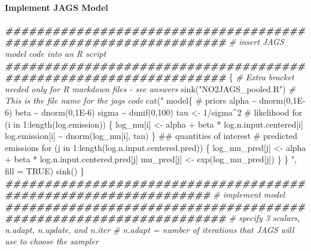 \documentclass[
]{article}
\newenvironment{Shaded}{\begin{snugshade}}{\end{snugshade}}
\newcommand{\AttributeTok}[1]{\textcolor[rgb]{0.77,0.63,0.00}{#1}}
\newcommand{\CommentTok}[1]{\textcolor[rgb]{0.56,0.35,0.01}{\textit{#1}}}
\newcommand{\ConstantTok}[1]{\textcolor[rgb]{0.00,0.00,0.00}{#1}}
\newcommand{\DocumentationTok}[1]{\textcolor[rgb]{0.56,0.35,0.01}{\textbf{\textit{#1}}}}
\newcommand{\FunctionTok}[1]{\textcolor[rgb]{0.00,0.00,0.00}{#1}}
\newcommand{\NormalTok}[1]{#1}
\newcommand{\StringTok}[1]{\textcolor[rgb]{0.31,0.60,0.02}{#1}}
\begin{document}
\hypertarget{implement-jags-model}{%
\paragraph{Implement JAGS Model}\label{implement-jags-model}}

\begin{Shaded}
\begin{Highlighting}[]
\DocumentationTok{\#\#\#\#\#\#\#\#\#\#\#\#\#\#\#\#\#\#\#\#\#\#\#\#\#\#\#\#\#\#\#\#\#\#\#\#\#\#\#\#\#\#\#\#\#\#\#\#\#\#\#\#\#\#\#\#\#\#\#\#\#\#\#\#\#\#}
\CommentTok{\# insert JAGS model code into an R script}
\DocumentationTok{\#\#\#\#\#\#\#\#\#\#\#\#\#\#\#\#\#\#\#\#\#\#\#\#\#\#\#\#\#\#\#\#\#\#\#\#\#\#\#\#\#\#\#\#\#\#\#\#\#\#\#\#\#\#\#\#\#\#\#\#\#\#\#\#\#\#}
\NormalTok{\{ }\CommentTok{\# Extra bracket needed only for R markdown files {-} see answers}
  \FunctionTok{sink}\NormalTok{(}\StringTok{"NO2JAGS\_pooled.R"}\NormalTok{) }\CommentTok{\# This is the file name for the jags code}
  \FunctionTok{cat}\NormalTok{(}\StringTok{"}
\StringTok{  model\{}
\StringTok{      \# priors}
\StringTok{      alpha \textasciitilde{} dnorm(0,1E{-}6)}
\StringTok{      beta \textasciitilde{} dnorm(0,1E{-}6)}
\StringTok{      sigma \textasciitilde{} dunif(0,100)}
\StringTok{      tau \textless{}{-} 1/sigma\^{}2}
\StringTok{    }
\StringTok{      \# likelihood}
\StringTok{      for (i in 1:length(log.emission)) \{}
\StringTok{        log\_mu[i] \textless{}{-} alpha + beta * log.n.input.centered[i]}
\StringTok{        log.emission[i] \textasciitilde{} dnorm(log\_mu[i], tau)}
\StringTok{      \}}
\StringTok{    }
\StringTok{      \#\# quantities of interest}
\StringTok{        \# predicted emissions}
\StringTok{        for (j in 1:length(log.n.input.centered.pred)) \{}
\StringTok{          log\_mu\_pred[j] \textless{}{-} alpha + beta * log.n.input.centered.pred[j]}
\StringTok{          mu\_pred[j] \textless{}{-} exp(log\_mu\_pred[j])}
\StringTok{        \}}
\StringTok{  \}}
\StringTok{  "}\NormalTok{, }\AttributeTok{fill =} \ConstantTok{TRUE}\NormalTok{)}
  \FunctionTok{sink}\NormalTok{()}
\NormalTok{\}}
\DocumentationTok{\#\#\#\#\#\#\#\#\#\#\#\#\#\#\#\#\#\#\#\#\#\#\#\#\#\#\#\#\#\#\#\#\#\#\#\#\#\#\#\#\#\#\#\#\#\#\#\#\#\#\#\#\#\#\#\#\#\#\#\#\#\#\#\#}
\CommentTok{\# implement model}
\DocumentationTok{\#\#\#\#\#\#\#\#\#\#\#\#\#\#\#\#\#\#\#\#\#\#\#\#\#\#\#\#\#\#\#\#\#\#\#\#\#\#\#\#\#\#\#\#\#\#\#\#\#\#\#\#\#\#\#\#\#\#\#\#\#\#\#\#\#\#}
\CommentTok{\# specify 3 scalars, n.adapt, n.update, and n.iter}
\CommentTok{\# n.adapt = number of iterations that JAGS will use to choose the sampler }

\end{Highlighting}
\end{Shaded}
\end{document}
